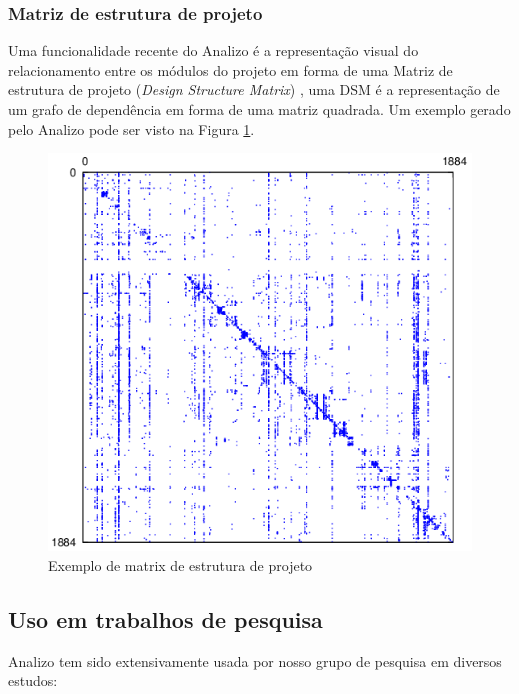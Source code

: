 \subsubsection{Matriz de estrutura de projeto}

Uma funcionalidade recente do Analizo é a representação visual do
relacionamento entre os módulos do projeto em forma de uma Matriz de estrutura
de projeto ({\it Design Structure Matrix}) \cite{Maccormack2006}, uma DSM é a
representação de um grafo de dependência em forma de uma matriz quadrada. Um
exemplo gerado pelo Analizo pode ser visto na Figura \ref{sample-dsm}.

\begin{figure}[h]
\center
\includegraphics[scale=0.3]{imagens/sample-dsm.png}
\caption{Exemplo de matrix de estrutura de projeto}
\label{sample-dsm}
\end{figure}

\subsection{Uso em trabalhos de pesquisa}
\label{trabalhos-analizo}

Analizo tem sido extensivamente usada por nosso grupo de pesquisa em diversos
estudos:

